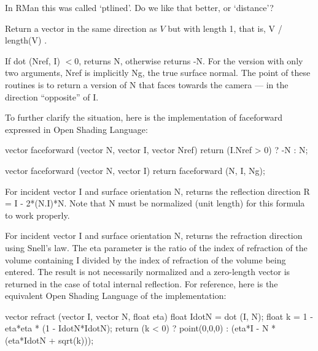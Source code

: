 \documentclass[11pt,letterpaper]{book}
\def\langname{Open Shading Language\xspace}
\begin{document}
\begin{annotate}
\QUESTION In RMan this was called `ptlined'.  Do we like that better, or `distance'?
\end{annotate}
\apiend

Return a vector in the same direction as $V$ but with length 1,
that is, {\cf V / length(V)} .
\apiend

If {\cf dot (Nref, I)} $<0$, returns {\cf N}, otherwise returns {\cf -N}.
For the version with only two arguments, {\cf Nref} is implicitly {\cf
Ng}, the true surface normal.  The point of these routines is to
return a version of {\cf N} that faces towards the camera --- in the
direction ``opposite'' of {\cf I}.

To further clarify the situation, here is the implementation of
{\cf faceforward} expressed in \langname:

\begin{code}
vector faceforward (vector N, vector I, vector Nref)
{
    return (I.Nref > 0) ? -N : N;
}

vector faceforward (vector N, vector I)
{
    return faceforward (N, I, Ng);
}
\end{code}
\apiend

For incident vector {\cf I} and surface orientation {\cf N}, returns the
reflection direction {\cf R = I - 2*(N.I)*N}.  Note that {\cf N} must be
normalized (unit length) for this formula to work properly.
\apiend

For incident vector {\cf I} and surface orientation {\cf N}, 
returns the refraction direction using Snell's law. The {\cf eta} 
parameter is the ratio of the index of refraction of the volume containing
{\cf I} divided by the index of refraction of the volume being entered.
The result is not necessarily normalized and a zero-length vector is 
returned in the case of total internal reflection.  
For reference, here is the equivalent \langname of the implementation:

\begin{code}
vector refract (vector I, vector N, float eta)
{
    float IdotN = dot (I, N);
    float k = 1 - eta*eta * (1 - IdotN*IdotN);
    return (k < 0) ? point(0,0,0) : (eta*I - N * (eta*IdotN + sqrt(k)));
}
\end{code}
\apiend
\end{document}
